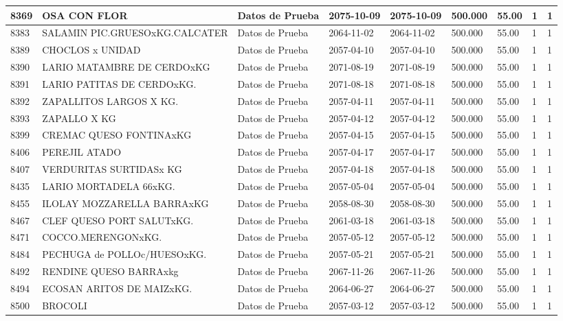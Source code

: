\documentclass[a4paper,12pt]{article}
\begin{document}
\begin{landscape}
\begin{longtable}{|p{4cm}|p{2.5cm}|p{2.5cm}|p{1.8cm}|p{1.8cm}|p{1cm}|p{1cm}|p{3cm}|p{3cm}||}
8369 & OSA CON FLOR & Datos de Prueba & 2075-10-09 & 2075-10-09 & 500.000 & 55.00 & 1 & 1 \\ \hline 
8383 & SALAMIN PIC.GRUESOxKG.CALCATER & Datos de Prueba & 2064-11-02 & 2064-11-02 & 500.000 & 55.00 & 1 & 1 \\ \hline 
8389 & CHOCLOS x UNIDAD & Datos de Prueba & 2057-04-10 & 2057-04-10 & 500.000 & 55.00 & 1 & 1 \\ \hline 
8390 & LARIO MATAMBRE DE CERDOxKG & Datos de Prueba & 2071-08-19 & 2071-08-19 & 500.000 & 55.00 & 1 & 1 \\ \hline 
8391 & LARIO PATITAS DE CERDOxKG. & Datos de Prueba & 2071-08-18 & 2071-08-18 & 500.000 & 55.00 & 1 & 1 \\ \hline 
8392 & ZAPALLITOS LARGOS X KG. & Datos de Prueba & 2057-04-11 & 2057-04-11 & 500.000 & 55.00 & 1 & 1 \\ \hline 
8393 & ZAPALLO X KG & Datos de Prueba & 2057-04-12 & 2057-04-12 & 500.000 & 55.00 & 1 & 1 \\ \hline 
8399 & CREMAC QUESO FONTINAxKG & Datos de Prueba & 2057-04-15 & 2057-04-15 & 500.000 & 55.00 & 1 & 1 \\ \hline 
8406 & PEREJIL ATADO & Datos de Prueba & 2057-04-17 & 2057-04-17 & 500.000 & 55.00 & 1 & 1 \\ \hline 
8407 & VERDURITAS SURTIDASx KG & Datos de Prueba & 2057-04-18 & 2057-04-18 & 500.000 & 55.00 & 1 & 1 \\ \hline 
8435 & LARIO MORTADELA 66xKG. & Datos de Prueba & 2057-05-04 & 2057-05-04 & 500.000 & 55.00 & 1 & 1 \\ \hline 
8455 & ILOLAY MOZZARELLA BARRAxKG & Datos de Prueba & 2058-08-30 & 2058-08-30 & 500.000 & 55.00 & 1 & 1 \\ \hline 
8467 & CLEF QUESO PORT SALUTxKG. & Datos de Prueba & 2061-03-18 & 2061-03-18 & 500.000 & 55.00 & 1 & 1 \\ \hline 
8471 & COCCO.MERENGONxKG. & Datos de Prueba & 2057-05-12 & 2057-05-12 & 500.000 & 55.00 & 1 & 1 \\ \hline 
8484 & PECHUGA de POLLOc/HUESOxKG. & Datos de Prueba & 2057-05-21 & 2057-05-21 & 500.000 & 55.00 & 1 & 1 \\ \hline 
8492 & RENDINE QUESO BARRAxkg & Datos de Prueba & 2067-11-26 & 2067-11-26 & 500.000 & 55.00 & 1 & 1 \\ \hline 
8494 & ECOSAN ARITOS DE MAIZxKG. & Datos de Prueba & 2064-06-27 & 2064-06-27 & 500.000 & 55.00 & 1 & 1 \\ \hline 
8500 & BROCOLI & Datos de Prueba & 2057-03-12 & 2057-03-12 & 500.000 & 55.00 & 1 & 1 \\ \hline 

\end{longtable}
\end{landscape}
\end{document}
